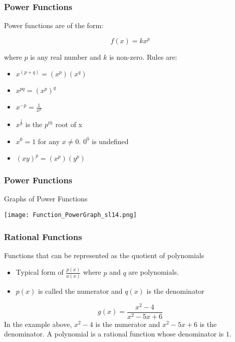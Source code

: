\documentclass{beamer}
\begin{document}
\begin{frame}[fragile]\frametitle{Power Functions}
\begin{center} Power functions are of the form: \end{center}

\begin{equation*}
  f(x) = kx^p
\end{equation*}
\begin{center} where $p$ is any real number and $k$ is non-zero. Rules are: \end{center}

\vfill
\begin{itemize}
  \item $x^{(p+q)} = (x^p)(x^q)$
  \item $x^{pq} = (x^p)^q$
  \item $x^{-p} = \frac{1}{x^p}$
  \item $x^{\frac{1}{p}}$ is the $p^{th}$ root of x
  \item $x^0 = 1$ for any $x \neq 0$. $0^0$ is undefined
  \item $(xy)^p = (x^p)(y^p)$
\end{itemize}

\end{frame}

\begin{frame}[fragile]\frametitle{Power Functions}
\begin{center}Graphs of Power Functions\end{center}

\begin{center}\texttt{[image: Function\_PowerGraph\_sl14.png]} \end{center}

\end{frame}

\begin{frame}[fragile]\frametitle{Rational Functions}
\begin{center} Functions that can be represented as the quotient of polynomials \end{center}

\begin{itemize}
  \item Typical form of $\frac{p(x)}{a(x)}$ where $p$ and $q$ are polynomials.
  \item $p(x)$ is called the numerator and $q(x)$ is the denominator
\end{itemize}

\vfill
\begin{equation*}
  g(x) = \frac{x^2 - 4}{x^2 - 5x + 6}
\end{equation*}
In the example above, $x^2 - 4$ is the numerator and $x^2 - 5x + 6$ is the denominator. A polynomial is a rational function whose denominator is $1$.

\end{frame}
\end{document}
